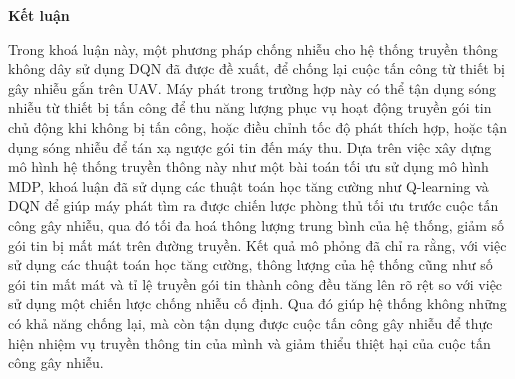 \documentclass{uetgraduation}
\begin{document}
\clearpage\noindent\Large\textbf{Kết luận}\par\normalsize\vspace{1cm}
Trong khoá luận này, một phương pháp chống nhiễu cho hệ thống truyền thông không dây sử dụng DQN đã được đề xuất, để chống lại cuộc tấn công từ thiết bị gây nhiễu gắn trên UAV. Máy phát 
trong trường hợp này có thể tận dụng sóng nhiễu từ thiết bị tấn công để thu năng lượng phục vụ hoạt động truyền gói tin chủ động khi không bị tấn công, hoặc điều chỉnh tốc
độ phát thích hợp, hoặc tận dụng sóng nhiễu để tán xạ ngược gói tin đến máy thu. Dựa trên việc xây dựng mô hình hệ thống truyền thông này như một bài toán tối ưu sử dụng mô hình MDP, khoá 
luận đã sử dụng các thuật toán học tăng cường như
Q-learning và DQN để giúp máy phát tìm ra được chiến lược phòng thủ tối ưu trước cuộc tấn công gây nhiễu, qua đó tối đa hoá thông lượng trung bình của hệ thống, giảm số gói tin bị mất mát 
trên đường truyền. Kết quả mô phỏng đã chỉ ra rằng, với việc sử dụng các thuật toán học tăng cường, thông lượng của hệ thống cũng như số gói tin mất mát và tỉ lệ truyền gói tin thành công đều tăng lên rõ
rệt so với việc sử dụng một chiến lược chống nhiễu cố định. Qua đó giúp hệ thống không những có khả năng chống lại, mà còn tận dụng được cuộc tấn công gây nhiễu
để thực hiện nhiệm vụ truyền thông tin của mình và giảm thiểu thiệt hại của cuộc tấn công gây nhiễu.
\end{document}

